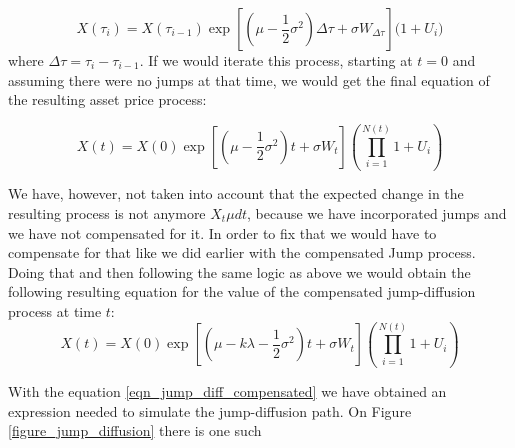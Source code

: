 \documentclass[times, utf8, diplomski]{fer}
\begin{document}
	$$X(\tau_i) = X(\tau_{i-1})\exp\left[ (\mu - \frac{1}{2}\sigma^2)\Delta\tau + \sigma W_{\Delta\tau} \right]\bigg(1+U_i\bigg)$$ 
	where $\Delta\tau = \tau_i - \tau_{i-1}$. If we would iterate this process, starting at $t=0$ and assuming there were no jumps at that time, we would get the final equation of the resulting asset price process:

	\begin{equation}\label{eqn_jump_diff}
		X(t) = X(0)\exp\left[ (\mu - \frac{1}{2}\sigma^2)t + \sigma W_{t} \right]\left(\prod_{i=1}^{N(t)}1+U_i\right)
	\end{equation}

	\noindent We have, however, not taken into account that the expected change in the resulting process is not anymore $X_t\mu dt$, because we have incorporated jumps and we have not compensated for it. In order to fix that we would have to compensate for that like we did earlier with the compensated Jump process. Doing that and then following the same logic as above we would obtain the following resulting equation for the value of the compensated jump-diffusion process at time $t$:
	\begin{equation} \label{eqn_jump_diff_compensated}
		X(t) = X(0)\exp\left[ (\mu - k\lambda- \frac{1}{2}\sigma^2)t + \sigma W_{t} \right]\left(\prod_{i=1}^{N(t)}1+U_i\right)
	\end{equation}

	\noindent With the equation \ref{eqn_jump_diff_compensated} we have obtained an expression needed to simulate the jump-diffusion path. On Figure \ref{figure_jump_diffusion} there is one such 
\end{document}
